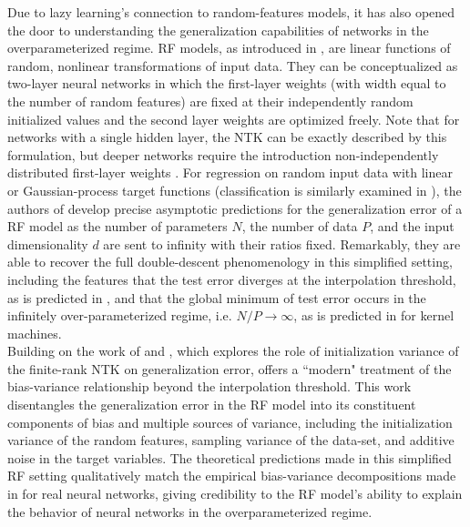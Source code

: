 \documentclass[a4paper, 12pt]{article}
\begin{document}
Due to lazy learning's connection to random-features models, it has also opened the door to understanding the generalization capabilities of networks in the overparameterized regime. RF models, as introduced in \cite{rahimiRandomFeaturesLargeScale2008}, are linear functions of random, nonlinear transformations of input data. They can be conceptualized as two-layer neural networks in which the first-layer weights (with width equal to the number of random features) are fixed at their independently random initialized values and the second layer weights are optimized freely. Note that for networks with a single hidden layer, the NTK can be exactly described by this formulation, but deeper networks require the introduction non-independently distributed first-layer weights \cite{chizatLazyTrainingDifferentiable2020}. For regression on random input data with linear or Gaussian-process target functions (classification is similarly examined in \cite{dengModelDoubleDescent2020}), the authors of \cite{meiGeneralizationErrorRandom2019} develop precise asymptotic predictions for the generalization error of a RF model as the number of parameters $N$, the number of data $P$, and the input dimensionality $d$ are sent to infinity with their ratios fixed. Remarkably, they are able to recover the full double-descent phenomenology in this simplified setting, including the features that the test error diverges at the interpolation threshold, as is predicted in \cite{geigerScalingDescriptionGeneralization2019}, and that the global minimum of test error occurs in the infinitely over-parameterized regime, i.e. $N/P\rightarrow\infty$, as is predicted in \cite{belkinReconcilingModernMachine2019,belkinUnderstandDeepLearning2018} for kernel machines.\\

Building on the work of \cite{meiGeneralizationErrorRandom2019} and \cite{ geigerScalingDescriptionGeneralization2019}, which explores the role of initialization variance of the finite-rank NTK on generalization error, \cite{dascoliDoubleTroubleDouble2020} offers a ``modern" treatment of the bias-variance relationship beyond the interpolation threshold. This work disentangles the generalization error in the RF model into its constituent components of bias and multiple sources of variance, including the initialization variance of the random features, sampling variance of the data-set, and additive noise in the target variables. The theoretical predictions made in this simplified RF setting qualitatively match the empirical bias-variance decompositions made in \cite{nealModernTakeBiasVariance2019} for real neural networks, giving credibility to the RF model's ability to explain the behavior of neural networks in the overparameterized regime.
\end{document}
